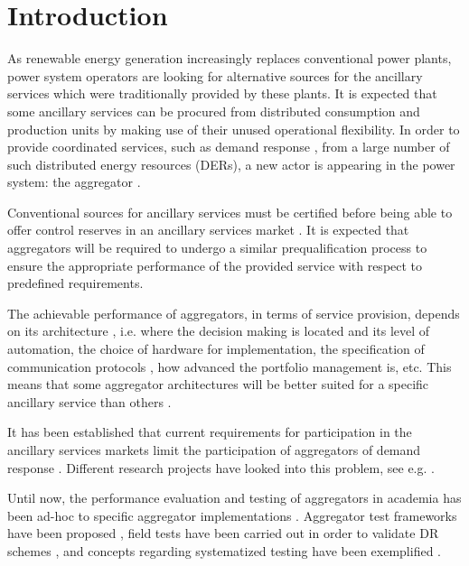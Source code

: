 \section{Introduction}
As renewable energy generation increasingly replaces conventional power plants, power system operators are looking for alternative sources for the ancillary services which were traditionally provided by these plants. It is expected that some ancillary services can be procured from distributed consumption and production units by making use of their unused operational flexibility. In order to provide coordinated services, such as demand response \cite{macdonald2012demand}, from a large number of such distributed energy resources (DERs), a new actor is appearing in the power system: the aggregator \cite{gkatzikis2013a}.%

Conventional sources for ancillary services must be certified before being able to offer control reserves in an ancillary services market \cite{energinet2012ancillary}. It is expected that aggregators will be required to undergo a similar prequalification process to ensure the appropriate performance of the provided service with respect to predefined requirements.

The achievable performance of aggregators, in terms of service provision, depends on its architecture \cite{bondy2015a}, i.e. where the decision making is located \cite{kosek2013overview} and its level of automation, the choice of hardware for implementation, the specification of communication protocols \cite{kiliccote2010open}, how advanced the portfolio management is, etc. This means that some aggregator architectures will be better suited for a specific ancillary service than others \cite{bondy2014performance}. 

It has been established that current requirements for participation in the ancillary services markets limit the participation of aggregators of demand response \cite{cappers2013assessment,coalition2014mapping}. Different research projects have looked into this problem, see e.g. \cite{bondy2014flech}. 

Until now, the performance evaluation and testing of aggregators in academia has been ad-hoc to specific aggregator implementations \cite{vrettos2015integrating,rahnama2014evaluation}. Aggregator test frameworks have been proposed \cite{buscher2015towards}, field tests have been carried out in order to validate DR schemes \cite{kiliccote2013field}, and concepts regarding systematized testing have been exemplified \cite{steinbrink2015challenges}.

